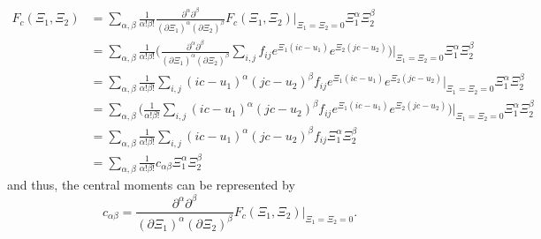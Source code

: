 \begin{equation}
  \label{eq: taylor of Fc}
  \begin{aligned}
    F_c(\Xi_1, \Xi_2) & = \sum_{\alpha,\beta} \frac{1}{\alpha!\beta!} \frac{\partial^\alpha\partial^\beta}{{(\partial \Xi_1)}^\alpha{(\partial \Xi_2)}^\beta} F_c(\Xi_1, \Xi_2)\Bigr|_{\Xi_1=\Xi_2 = 0} \Xi_1^\alpha \Xi_2^\beta \\
    & = \sum_{\alpha,\beta} \frac{1}{\alpha!\beta!} \Bigg(
      \frac{\partial^\alpha\partial^\beta}{{(\partial \Xi_1)}^\alpha{(\partial \Xi_2)}^\beta}
        \sum_{i,j}f_{ij} e^{\Xi_1 (ic-u_1)} e^{\Xi_2 (jc-u_2)} \Bigg)\Bigr|_{\Xi_1=\Xi_2 = 0} \Xi_1^\alpha \Xi_2^\beta \\
    & = \sum_{\alpha,\beta} \frac{1}{\alpha!\beta!}
      \sum_{i,j} {(ic-u_1)}^\alpha {(jc-u_2)}^\beta f_{ij} e^{\Xi_1 (ic-u_1)} e^{\Xi_2 (jc-u_2)} \Bigr|_{\Xi_1=\Xi_2 = 0} \Xi_1^\alpha \Xi_2^\beta \\
    & = \sum_{\alpha,\beta} \Bigg(
        \frac{1}{\alpha!\beta!}
        \sum_{i,j} {\left(ic - u_1\right)}^\alpha {\left(jc - u_2\right)}^\beta f_{ij} e^{\Xi_1 (ic-u_1)} e^{\Xi_2 (jc-u_2)}
      \Bigg)\Bigr|_{\Xi_1=\Xi_2 = 0} \Xi_1^\alpha \Xi_2^\beta \\
    & = \sum_{\alpha,\beta} \frac{1}{\alpha!\beta!}
      \sum_{i,j} {\left(ic - u_1\right)}^\alpha {\left(jc - u_2\right)}^\beta f_{ij} \Xi_1^\alpha \Xi_2^\beta \\
    & = \sum_{\alpha,\beta} \frac{1}{\alpha!\beta!} c_{\alpha\beta} \Xi_1^\alpha \Xi_2^\beta
  \end{aligned}
\end{equation}
%
and thus, the central moments can be represented by
\begin{equation}
  \label{eq: alternative representation of central moments}
  c_{\alpha\beta} = \frac{\partial^\alpha\partial^\beta}{{(\partial \Xi_1)}^\alpha{(\partial \Xi_2)}^\beta} F_c(\Xi_1, \Xi_2)\Bigr|_{\Xi_1=\Xi_2 = 0}.
\end{equation}

